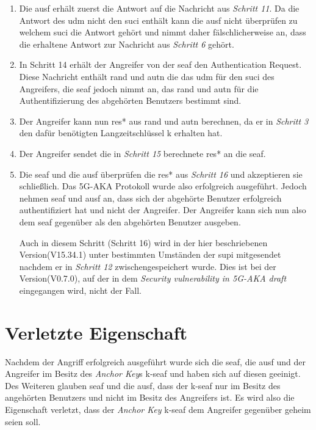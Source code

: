 \begin{enumerate}
\item Die \gls{ausf} erhält zuerst die Antwort auf die Nachricht aus \textit{Schritt 11}.
Da die Antwort des \gls{udm} nicht den \gls{suci} enthält kann die \gls{ausf} nicht überprüfen zu welchem \gls{suci} die Antwort gehört und nimmt daher fälschlicherweise an, dass die erhaltene Antwort zur Nachricht aus \textit{Schritt 6} gehört.

\item In Schritt 14 erhält der Angreifer von der \gls{seaf} den Authentication Request.
Diese Nachricht enthält \gls{rand} und \gls{autn} die das \gls{udm} für den \gls{suci} des Angreifers, die \gls{seaf} jedoch nimmt an, das \gls{rand} und \gls{autn} für die Authentifizierung des abgehörten Benutzers bestimmt sind.

\item Der Angreifer kann nun \gls{res*} aus \gls{rand} und \gls{autn} berechnen, da er in \textit{Schritt 3} den dafür benötigten Langzeitschlüssel \gls{k} erhalten hat.

\item Der Angreifer sendet die in \textit{Schritt 15} berechnete \gls{res*} an die \gls{seaf}.

\item Die \gls{seaf} und die \gls{ausf} überprüfen die \gls{res*} aus \textit{Schritt 16} und akzeptieren sie schließlich.
Das 5G-AKA Protokoll wurde also erfolgreich ausgeführt.
Jedoch nehmen \gls{seaf} und \gls{ausf} an, dass sich der abgehörte Benutzer erfolgreich authentifiziert hat und nicht der Angreifer.
Der Angreifer kann sich nun also dem \gls{seaf} gegenüber als den abgehörten Benutzer ausgeben.

Auch in diesem Schritt (Schritt 16) wird in der hier beschriebenen Version(V15.34.1) unter bestimmten Umständen der \gls{supi} mitgesendet nachdem er in \textit{Schritt 12} zwischengespeichert wurde.
Dies ist bei der Version(V0.7.0), auf der in dem \textit{Security vulnerability in 5G-AKA draft} eingegangen wird, nicht der Fall.


\end{enumerate}


\section{Verletzte Eigenschaft}

Nachdem der Angriff erfolgreich ausgeführt wurde sich die \gls{seaf}, die \gls{ausf} und der Angreifer im Besitz des \textit{Anchor Key}s \gls{k-seaf} und haben sich auf diesen geeinigt.
Des Weiteren glauben \gls{seaf} und die \gls{ausf}, dass der \gls{k-seaf} nur im Besitz des angehörten Benutzers und nicht im Besitz des Angreifers ist.
Es wird also die Eigenschaft verletzt, dass der \textit{Anchor Key} \gls{k-seaf} dem Angreifer gegenüber geheim seien soll.

